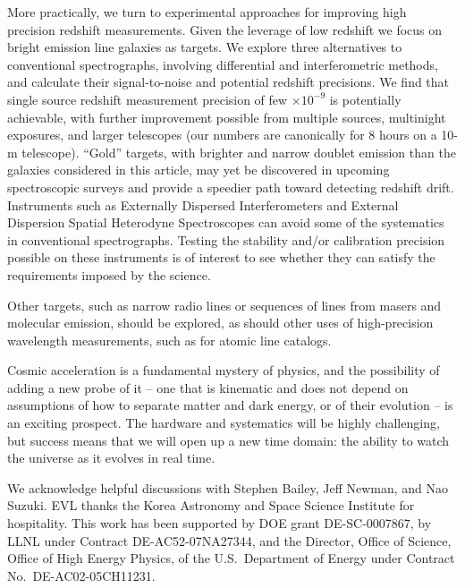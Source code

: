 \documentclass[preprint2, 10pt]{aastex}
\begin{document}
More practically, we turn to experimental approaches for improving high 
precision redshift measurements. Given the leverage of low redshift 
we focus on bright emission line galaxies as targets. We explore three 
alternatives to conventional spectrographs, involving differential and 
interferometric methods, and calculate their signal-to-noise 
and potential redshift precisions. We find that single source redshift 
measurement precision of few $\times 10^{-9}$ is potentially achievable, 
with further improvement possible from multiple sources, multinight 
exposures, and larger telescopes (our numbers are canonically for 8 hours 
on a 10-m telescope). ``Gold'' targets, with brighter and narrow doublet
emission than the galaxies considered in this article, may yet be discovered
in upcoming spectroscopic surveys and provide a speedier path toward
detecting redshift drift. 
Instruments 
such as Externally Dispersed Interferometers and External Dispersion Spatial 
Heterodyne Spectroscopes can avoid some of the systematics in conventional 
spectrographs. 
Testing the stability and/or calibration precision possible on these 
instruments is of interest to see whether they can satisfy the requirements 
imposed by the science. 

Other targets, such as narrow radio lines or sequences of lines
from masers and molecular emission, should be 
explored, as should other uses of high-precision wavelength measurements, 
such as for atomic line catalogs. 

Cosmic acceleration is a fundamental mystery of physics, and the possibility 
of adding a new probe of it -- one that is kinematic and does not depend on 
assumptions of how to separate matter and dark energy, or of their evolution -- 
is an exciting prospect. The hardware and systematics will be highly 
challenging, but success means that we will open up a new time domain: the 
ability to watch the universe as it evolves in real time. 


\acknowledgments 

We acknowledge helpful discussions with Stephen Bailey, Jeff Newman, and 
Nao Suzuki. EVL thanks the 
Korea Astronomy and Space Science Institute for hospitality. 
This work has been supported by DOE grant DE-SC-0007867,
by LLNL under Contract DE-AC52-07NA27344, and the Director, 
Office of Science, Office of High Energy Physics, 
of the U.S.\ Department of Energy under Contract No.\ DE-AC02-05CH11231. 




\end{document}
